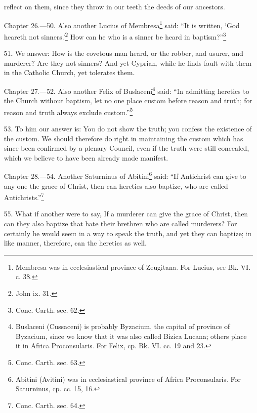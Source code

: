 reflect on them, since they throw in our teeth the deeds of our ancestors.


Chapter 26.—50. Also another Lucius of Membresa\footnote{\par  Membresa was in ecclesiastical province of Zeugitana. For Lucius, see Bk. VI. c. 38.} said: ``It is written, ‘God heareth not sinners.’\footnote{\par  John ix. 31.} How can he who is a sinner be heard in baptism?''\footnote{\par  Conc. Carth. sec. 62.}

51. We answer: How is the covetous man heard, or the robber, and usurer, and murderer? Are they not sinners? And yet Cyprian, while he finds fault with them in the Catholic Church, yet tolerates them.


Chapter 27.—52. Also another Felix of Buslaceni\footnote{\par  Buslaceni (Cussaceni) is probably Byzacium, the capital of province of Byzacium, since we know that it was also called Bizica Lucana; others place it in Africa Proconsularis. For Felix, cp. Bk. VI. cc. 19 and 23.} said: ``In admitting heretics to the Church without baptism, let no one place custom before reason and truth; for reason and truth always exclude custom.''\footnote{\par  Conc. Carth. sec. 63.}

53. To him our answer is: You do not show the truth; you confess the existence of the custom. We should therefore do right in maintaining the custom which has since been confirmed by a plenary Council, even if the truth were still concealed, which we believe to have been already made manifest.


Chapter 28.—54. Another Saturninus of Abitini\footnote{\par  Abitini (Avitini) was in ecclesiastical province of Africa Proconsularis. For Saturninus, cp. cc. 15, 16.} said: ``If Antichrist can give to any one the grace of Christ, then can heretics also baptize, who are called Antichrists.''\footnote{\par  Conc. Carth. sec. 64.}

55. What if another were to say, If a murderer can give the grace of Christ, then can they also baptize that hate their brethren who are called murderers? For certainly he would seem in a way to speak the truth, and yet they can baptize; in like manner, therefore, can the heretics as well.

